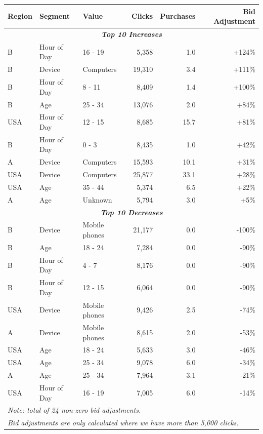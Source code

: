 \begin{table}[h!]
\centering
\tiny %
\begin{tabular}{lllrrr}
\toprule
\textbf{Region} & \textbf{Segment} & \textbf{Value} & \textbf{Clicks} & \textbf{Purchases} & \textbf{Bid Adjustment} \\
\midrule
\multicolumn{6}{c}{\textit{\textbf{Top 10 Increases}}} \\
\midrule
B & Hour of Day & 16 - 19 & 5,358 & 1.0 & +124\% \\
B & Device & Computers & 19,310 & 3.4 & +111\% \\
B & Hour of Day & 8 - 11 & 8,409 & 1.4 & +100\% \\
B & Age & 25 - 34 & 13,076 & 2.0 & +84\% \\
USA & Hour of Day & 12 - 15 & 8,685 & 15.7 & +81\% \\
B & Hour of Day & 0 - 3 & 8,435 & 1.0 & +42\% \\
A & Device & Computers & 15,593 & 10.1 & +31\% \\
USA & Device & Computers & 25,877 & 33.1 & +28\% \\
USA & Age & 35 - 44 & 5,374 & 6.5 & +22\% \\
A & Age & Unknown & 5,794 & 3.0 & +5\% \\
\midrule
\multicolumn{6}{c}{\textit{\textbf{Top 10 Decreases}}} \\
\midrule
B & Device & Mobile phones & 21,177 & 0.0 & -100\% \\
B & Age & 18 - 24 & 7,284 & 0.0 & -90\% \\
B & Hour of Day & 4 - 7 & 8,176 & 0.0 & -90\% \\
B & Hour of Day & 12 - 15 & 6,064 & 0.0 & -90\% \\
USA & Device & Mobile phones & 9,426 & 2.5 & -74\% \\
A & Device & Mobile phones & 8,615 & 2.0 & -53\% \\
USA & Age & 18 - 24 & 5,633 & 3.0 & -46\% \\
USA & Age & 25 - 34 & 9,078 & 6.0 & -34\% \\
A & Age & 25 - 34 & 7,964 & 3.1 & -21\% \\
USA & Hour of Day & 16 - 19 & 7,005 & 6.0 & -14\% \\
\bottomrule
\multicolumn{6}{l}{\textit{Note: total of 24 non-zero bid adjustments.}} \\
\multicolumn{6}{l}{\textit{Bid adjustments are only calculated where we have more than 5,000 clicks.}} \\
\end{tabular}
\end{table}